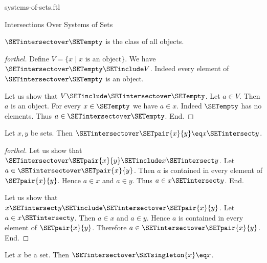 \documentclass{naproche-library}
\begin{document}
\begin{smodule}[title=Systems of Sets]{systems-of-sets.ftl}
\begin{sfragment}{Intersections Over Systems of Sets}
  \begin{proposition}[forthel,id=FOUNDATIONS_10_2809770322952192]
    $\SETintersectover \SETempty$ is the class of all objects.
  \end{proposition}
  \begin{proof}[forthel]
    Define $V = \{ x \mid x\text{ is an object}\}$.
    We have $\SETintersectover \SETempty \SETinclude V$.
    Indeed every element of $\SETintersectover \SETempty$ is an object.

    Let us show that $V \SETinclude \SETintersectover \SETempty$.
      Let $a \in V$.
      Then $a$ is an object.
      For every $x \in \SETempty$ we have $a \in x$.
      Indeed $\SETempty$ has no elements.
      Thus $a \in \SETintersectover \SETempty$.
    End.
  \end{proof}

  \begin{proposition}[forthel,id=FOUNDATIONS_10_7851827447988224]
    Let $x, y$ be sets.
    Then $\SETintersectover \SETpair{x}{y} \eq x \SETintersect y$.
  \end{proposition}
  \begin{proof}[forthel]
    Let us show that $\SETintersectover \SETpair{x}{y} \SETinclude x \SETintersect y$.
      Let $a \in \SETintersectover \SETpair{x}{y}$.
      Then $a$ is contained in every element of $\SETpair{x}{y}$.
      Hence $a \in x$ and $a \in y$.
      Thus $a \in x \SETintersect y$.
    End.

    Let us show that $x \SETintersect y \SETinclude \SETintersectover \SETpair{x}{y}$.
      Let $a \in x \SETintersect y$.
      Then $a \in x$ and $a \in y$.
      Hence $a$ is contained in every element of $\SETpair{x}{y}$.
      Therefore $a \in \SETintersectover \SETpair{x}{y}$.
    End.
  \end{proof}

  \begin{corollary}[forthel,id=FOUNDATIONS_10_7239895674257408]
    Let $x$ be a set.
    Then $\SETintersectover \SETsingleton{x} \eq x$.
  \end{corollary}
\end{sfragment}
\end{smodule}
\end{document}
